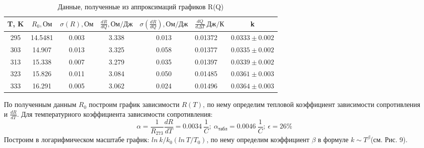 \documentclass[a4paper, 12pt]{article}%
\begin{document}
	\begin{table}[H]
		\centering
		\begin{tabular}{|c|c|c|c|c|l|l|}
			\hline
		T, K & $R_{0}, Ом$   & $\sigma(R), Ом$ & $\frac{dR}{dQ}, Ом/Дж$ & $\sigma(\frac{dR}{dQ}), Ом/Дж$ & \multicolumn{1}{c|}{$\frac{dQ}{d\Delta T}~ Дж/К$} & \multicolumn{1}{c|}{k}\\ \hline
			295  & 14.5481 & 0.003  & 3.338 & 0.013       & 0.01372                     & $0.0333 \pm 0.002$                 \\ \hline
			303  & 14.907 & 0.013  & 3.325 & 0.058       & 0.01377                     & $0.0335 \pm 0.002$                \\ \hline
			313  & 15.338 & 0.007  & 3.279 & 0.035       & 0.01397                     & $0.0339 \pm 0.002$                 \\ \hline
			323  & 15.826 & 0.011  & 3.084 & 0.050       & 0.01485                     & $0.0361 \pm 0.003$                 \\ \hline
			333  & 16.291 & 0.005  & 3.062 & 0.024       & 0.01496                     & $0.0364 \pm 0.003$               \\ \hline
		\end{tabular}
	\caption{Данные, полученные из аппроксимаций графиков R(Q)}
	\end{table}
	По полученным данным $R_{0}$ построим график зависимости $R(T)$, по нему определим тепловой коэффициент зависимости сопротивления и $\frac{dR}{dT}$.
	Для температурного коэффициента зависимости сопротивления:
	\begin{equation}
		\alpha = \frac{1}{R_{273}}\frac{dR}{dT} = 0.0034 ~\frac{1}{C};
		~\alpha_{табл} = 0.0046 ~\frac{1}{C};~ \epsilon = 26 \%
	\end{equation}
	Построим в логарифмическом масштабе график: $ln~k/k_{0}(ln~T/T_{0})$, по нему определим коэффициент $\beta$ в формуле $k \sim T^{\beta}$(см. Рис. 9).
\end{document}

